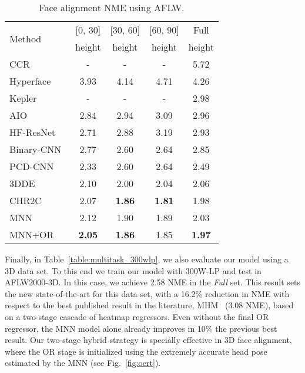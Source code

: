 \documentclass[9pt,technote,compsoc]{IEEEtran}
\begin{document}
\begin{table}[htbp!]
\begin{center}
\begin{tabular}{l|c|c|c|c}
\hline
\multirow{2}{*}{Method} & [0, 30] & [30, 60] & [60, 90] & Full\\
 & height & height & height & height\\
\hline
CCR~\cite{Zhang18c} & - & - & - & 5.72\\
Hyperface~\cite{Ranjan19} & 3.93 & 4.14 & 4.71 & 4.26\\
Kepler~\cite{Kumar18b} & - & - & - & 2.98\\
AIO~\cite{Ranjan17} & 2.84 & 2.94 & 3.09 & 2.96\\
HF-ResNet~\cite{Ranjan19} & 2.71 & 2.88 & 3.19 & 2.93\\ 
Binary-CNN~\cite{Bulat17a} & 2.77 & 2.60 & 2.64 & 2.85\\
PCD-CNN~\cite{Kumar18a} & 2.33 & 2.60 & 2.64 & 2.49\\
3DDE~\cite{Valle19b} & 2.10 & 2.00 & 2.04 & 2.06\\
CHR2C~\cite{Valle19a} & 2.07 & \textbf{1.86} & \textbf{1.81} & 1.98\\
\hline
MNN & 2.12 & 1.90 & 1.89 & 2.03\\
MNN+OR & \textbf{2.05} & \textbf{1.86} & 1.85 & \textbf{1.97}\\
\hline
\end{tabular}
\end{center}
\caption{Face alignment NME using AFLW.}
\label{table:multitask_aflw}
\end{table}



Finally, in Table~\ref{table:multitask_300wlp}, we also evaluate our model using a 3D data set. To this end we train our model with 300W-LP and test in AFLW2000-3D.
In this case, we achieve 2.58 \textrm{NME} in the \textit{Full} set. This result sets the new state-of-the-art for this data set, with a 16.2\% reduction in \textrm{NME} with respect to the best published result in the literature, MHM~\cite{Deng18} (3.08 \textrm{NME}), based on a two-stage cascade of heatmap regressors. Even without the final OR regressor, the MNN model alone already improves in 10\% the previous best result. 
Our two-stage hybrid strategy is specially effective in 3D face alignment, where the OR stage is initialized using the extremely accurate head pose estimated by the MNN
(see Fig.~\ref{fig:oert}).
\end{document}
